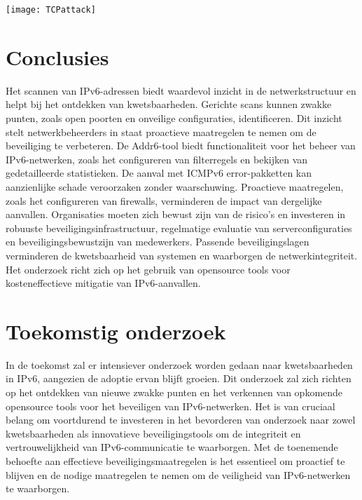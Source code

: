 \documentclass[a0,portrait]{hogent-poster}
\begin{document}
\begin{multicols}{2}
\begin{center}
  \captionsetup{type=figure}
  \texttt{[image: TCPattack]}
\end{center}


\section{Conclusies}

Het scannen van IPv6-adressen biedt waardevol inzicht in de netwerkstructuur en helpt bij het ontdekken van kwetsbaarheden. Gerichte scans kunnen zwakke punten, zoals open poorten en onveilige configuraties, identificeren. Dit inzicht stelt netwerkbeheerders in staat proactieve maatregelen te nemen om de beveiliging te verbeteren. De Addr6-tool biedt functionaliteit voor het beheer van IPv6-netwerken, zoals het configureren van filterregels en bekijken van gedetailleerde statistieken. De aanval met ICMPv6 error-pakketten kan aanzienlijke schade veroorzaken zonder waarschuwing. Proactieve maatregelen, zoals het configureren van firewalls, verminderen de impact van dergelijke aanvallen. Organisaties moeten zich bewust zijn van de risico's en investeren in robuuste beveiligingsinfrastructuur, regelmatige evaluatie van serverconfiguraties en beveiligingsbewustzijn van medewerkers. Passende beveiligingslagen verminderen de kwetsbaarheid van systemen en waarborgen de netwerkintegriteit. Het onderzoek richt zich op het gebruik van opensource tools voor kosteneffectieve mitigatie van IPv6-aanvallen.

\section{Toekomstig onderzoek}


In de toekomst zal er intensiever onderzoek worden gedaan naar kwetsbaarheden in IPv6, aangezien de adoptie ervan blijft groeien. Dit onderzoek zal zich richten op het ontdekken van nieuwe zwakke punten en het verkennen van opkomende opensource tools voor het beveiligen van IPv6-netwerken. Het is van cruciaal belang om voortdurend te investeren in het bevorderen van onderzoek naar zowel kwetsbaarheden als innovatieve beveiligingstools om de integriteit en vertrouwelijkheid van IPv6-communicatie te waarborgen. Met de toenemende behoefte aan effectieve beveiligingsmaatregelen is het essentieel om proactief te blijven en de nodige maatregelen te nemen om de veiligheid van IPv6-netwerken te waarborgen.

\end{multicols}
\end{document}

